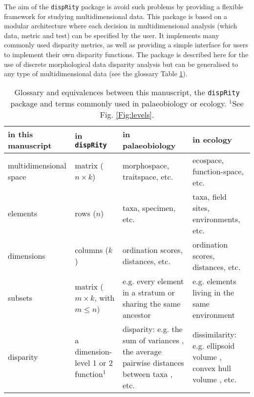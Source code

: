 \documentclass[12pt,letterpaper]{article}
\newcommand{\disp}{\texttt{dispRity} }
\begin{document}
The aim of the \disp package is avoid such problems by providing a flexible framework for studying multidimensional data.
This package is based on a modular architecture where each decision in multidimensional analysis (which data, metric and test) can be specified by the user.
It implements many commonly used disparity metrics, as well as providing a simple interface for users to implement their own disparity functions.
The package is described here for the use of discrete morphological data disparity analysis but can be generalised to any type of multidimensional data (see the glossary Table \ref{Tab:terms}).

\begin{table}
    \begin{tabular}{p{4cm}p{5cm}p{6cm}p{6cm}}
        \hline
        \textbf{in this manuscript} & \textbf{in} \texttt{\textbf{dispRity}} & \textbf{in palaeobiology} & \textbf{in ecology} \\ 
        \hline
        multidimensional space & matrix ($n\times k$) & morphospace, traitspace, etc. & ecospace, function-space, etc. \\
        \hline
        elements & rows ($n$) & taxa, specimen, etc. & taxa, field sites, environments, etc. \\
        \hline
        dimensions & columns ($k$) & ordination scores, distances, etc. & ordination scores, distances, etc. \\
        \hline
        subsets & matrix ($m \times k$, with $m \leq n$) & e.g. every element in a stratum or sharing the same ancestor & e.g. elements living in the same environment \\
        \hline
        disparity & a dimension-level 1 or 2 function$^1$ & disparity: e.g. the sum of variances \citep{Wills2001}, the average pairwise distances between taxa \citep{Foote01071994}, etc. & dissimilarity: e.g. ellipsoid volume \citep{DonohueDim}, convex hull volume \citep{cornwell2006trait}, etc. \\
        \hline
    \end{tabular}
    \caption{Glossary and equivalences between this manuscript, the \texttt{dispRity} package and terms commonly used in palaeobiology or ecology. $^1$See Fig. \ref{Fig:levels}.}
    \label{Tab:terms}
\end{table}
\end{document}
